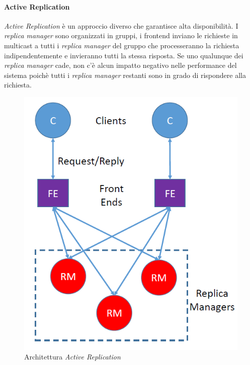 \documentclass{article}
\begin{document}
\paragraph{Active Replication}
\textit{Active Replication} è un approccio diverso che garantisce alta disponibilità. I \textit{replica manager} sono organizzati in gruppi, i frontend inviano le richieste in multicast a tutti i \textit{replica manager} del gruppo che processeranno la richiesta indipendentemente e invieranno tutti la stessa risposta. Se uno qualunque dei \textit{replica manager} cade, non c'è alcun impatto negativo nelle performance del sistema poichè tutti i \textit{replica manager} restanti sono in grado di rispondere alla richiesta.

\begin{figure}[H]
\centering
\includegraphics[scale=0.5]{img/ActiveReplication.PNG}
\caption{Architettura \textit{Active Replication}}
\end{figure}
\end{document}
